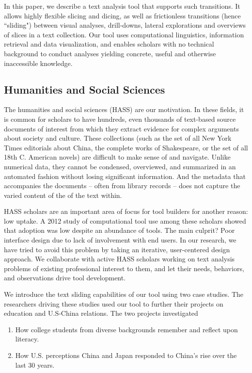 \documentclass{sig-alternate}
\begin{document}
In this paper, we describe a text analysis tool that supports such transitions. It allows highly flexible slicing and dicing, as well as frictionless transitions (hence ``sliding") between visual analyses, drill-downs, lateral explorations and overviews of slices in a text collection. Our tool uses computational linguistics, information retrieval and data visualization, and enables scholars with no technical background to conduct analyses yielding concrete, useful and otherwise inaccessible knowledge.

\subsection{Humanities and Social Sciences}
The humanities and social sciences (HASS) are our motivation. In these fields, it is common for scholars to have hundreds, even thousands of text-based source documents of interest from which they extract evidence for complex arguments about society and culture. These collections (such as the set of all New York Times editorials about China, the complete works of Shakespeare, or the set of all 18th C. American novels)  are difficult to make sense of and navigate. Unlike numerical data, they cannot be condensed, overviewed, and summarized in an automated fashion without losing significant information. And the metadata that accompanies the documents -- often from library records -- does not capture the varied content of the of the text within.

HASS scholars are an important area of focus for tool builders for another reason: low uptake. A 2012 study of computational tool use among these scholars showed that adoption was low despite an abundance of tools. The main culprit? Poor interface design due to lack of involvement with end users. In our research, we have tried to avoid this problem by taking an iterative, user-centered design approach. We collaborate with active HASS scholars working on text analysis problems of existing professional interest to them, and let their needs, behaviors, and observations drive tool development.

We introduce the text sliding capabilities of our tool using two case studies. The researchers driving these studies used our tool to further their projects on  education and U.S-China relations. The two projects investigated
\begin{enumerate}
	\item How college students from diverse backgrounds remember and reflect upon literacy.
	\item How U.S. perceptions China and Japan responded to China's rise over the last 30 years.
\end{enumerate}
\end{document}
